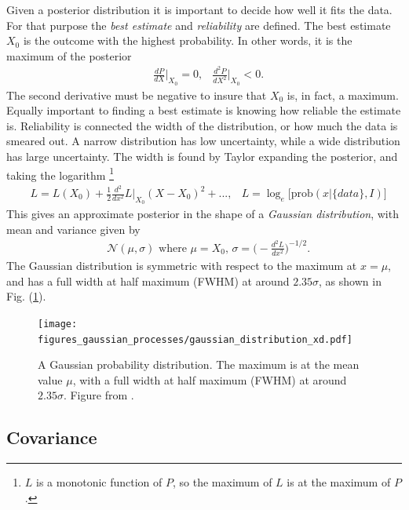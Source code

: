 \documentclass[twoside,english]{uiofysmaster}
\begin{document}
Given a posterior distribution it is important to decide how well it fits the data. For that purpose the \textit{best estimate} and \textit{reliability} are defined. The best estimate $X_0$  is the outcome with the highest probability. In other words, it is the maximum of the posterior
\begin{align}
&\frac{dP}{dX}\Big|_{X_0} = 0, &\frac{d^2P}{dX^2}\Big|_{X_0} < 0.
\end{align}
The second derivative must be negative to insure that $X_0$ is, in fact, a maximum. Equally important to finding a best estimate is knowing how reliable the estimate is. Reliability is connected the width of the distribution, or how much the data is smeared out. A narrow distribution has low uncertainty, while a wide distribution has large uncertainty. The width is found by Taylor expanding the posterior, and taking the logarithm \footnote{$L$ is a monotonic function of $P$, so the maximum of $L$ is at the maximum of $P$.}
\begin{align}
&L = L(X_0) + \frac{1}{2} \frac{d^2}{dx^2} L\Big|_{X_0} (X-X_0)^2 +... ,&L = \log_e \Big[\text{prob}(x | \{data\}, I) \Big]\label{Eq:: gaussian process : Taylor expansion L}
\end{align}
This gives an approximate posterior in the shape of a \textit{Gaussian distribution}, with mean and variance given by
\begin{align}
&\mathcal{N}( \mu, \sigma) \text{ where } \mu = X_0\text{, } \sigma = \Big( - \frac{d^2L}{dx^2} \Big)^{-1/2}.
\end{align}
The Gaussian distribution is symmetric with respect to the maximum at $x = \mu$, and has a full width at half maximum (FWHM) at around $2.35 \sigma$, as shown in Fig. (\ref{Fig:: gaussian process : Gaussian distribution}).

\begin{figure}
\centering
\texttt{[image: figures\_gaussian\_processes/gaussian\_distribution\_xd.pdf]}
\caption{A Gaussian probability distribution. The maximum is at the mean value $\mu$, with a full width at half maximum (FWHM) at around $2.35 \sigma$. Figure from \cite{sivia2006data}.}
\label{Fig:: gaussian process : Gaussian distribution}
\end{figure}

\subsection{Covariance}
\end{document}
